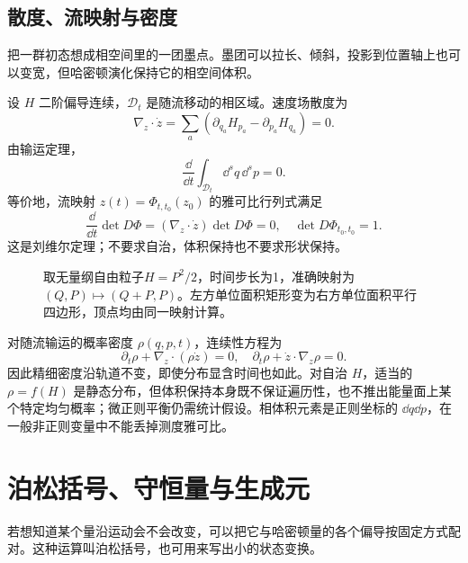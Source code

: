 \subsection{散度、流映射与密度}
把一群初态想成相空间里的一团墨点。墨团可以拉长、倾斜，投影到位置轴上也可以变宽，但哈密顿演化保持它的相空间体积。

设 $H$ 二阶偏导连续，$\mathcal D_t$ 是随流移动的相区域。速度场散度为
\[
\nabla_z\cdot\dot z=\sum_a(\partial_{q_a}H_{p_a}-\partial_{p_a}H_{q_a})=0.
\]
由输运定理，
\begin{equation}
\frac{\dd}{\dd t}\int_{\mathcal D_t}\dd^sq\,\dd^sp=0.
\label{eq:liouville}
\end{equation}
等价地，流映射 $z(t)=\Phi_{t,t_0}(z_0)$ 的雅可比行列式满足
\[
\frac{\dd}{\dd t}\det D\Phi=(\nabla_z\cdot\dot z)\det D\Phi=0,
\quad \det D\Phi_{t_0,t_0}=1.
\]
这是刘维尔定理；不要求自治，体积保持也不要求形状保持。

\begin{figure}[htbp]
\centering
{}
\caption{取无量纲自由粒子$H=P^2/2$，时间步长为1，准确映射为$(Q,P)\mapsto(Q+P,P)$。左方单位面积矩形变为右方单位面积平行四边形，顶点均由同一映射计算。}
\label{fig:liouville}
\end{figure}

对随流输运的概率密度 $\rho(q,p,t)$，连续性方程为
\[
\partial_t\rho+\nabla_z\cdot(\rho\dot z)=0,
\quad \partial_t\rho+\dot z\cdot\nabla_z\rho=0.
\]
因此精细密度沿轨道不变，即使分布显含时间也如此。对自治 $H$，适当的 $\rho=f(H)$ 是静态分布，但体积保持本身既不保证遍历性，也不推出能量面上某个特定均匀概率；微正则平衡仍需统计假设。相体积元素是正则坐标的 $\dd q\dd p$，在一般非正则变量中不能丢掉测度雅可比。


\section{泊松括号、守恒量与生成元}
若想知道某个量沿运动会不会改变，可以把它与哈密顿量的各个偏导按固定方式配对。这种运算叫泊松括号，也可用来写出小的状态变换。

